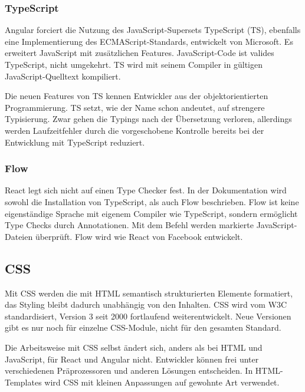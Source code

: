 \subsubsection{TypeScript}
Angular forciert die Nutzung des JavaScript-Supersets TypeScript (TS), ebenfalls eine Implementierung des ECMAScript-Standards, entwickelt von Microsoft. Es erweitert JavaScript mit zusätzlichen Features. JavaScript-Code ist valides TypeScript, nicht umgekehrt. TS wird mit seinem Compiler in gültigen JavaScript-Quelltext kompiliert.

Die neuen Features von TS kennen Entwickler aus der objektorientierten Programmierung. TS setzt, wie der Name schon andeutet, auf strengere Typisierung. Zwar gehen die Typings nach der Übersetzung verloren, allerdings werden Laufzeitfehler durch die vorgeschobene Kontrolle bereits bei der Entwicklung mit TypeScript reduziert.\cite{TypeScript}

\subsubsection{Flow}

React legt sich nicht auf einen Type Checker fest. In der Dokumentation wird sowohl die Installation von TypeScript, als auch Flow beschrieben. Flow ist keine eigenständige Sprache mit eigenem Compiler wie TypeScript, sondern ermöglicht Type Checks durch Annotationen. Mit dem Befehl  werden markierte JavaScript-Dateien überprüft. Flow wird wie React von Facebook entwickelt.\cite{Flow}

\subsection{CSS}
Mit CSS werden die mit HTML semantisch strukturierten Elemente formatiert, das Styling bleibt dadurch unabhängig von den Inhalten. CSS wird vom W3C standardisiert, Version 3 seit 2000 fortlaufend weiterentwickelt. Neue Versionen gibt es nur noch für einzelne CSS-Module, nicht für den gesamten Standard.\cite{CSS4} 

Die Arbeitsweise mit CSS selbst ändert sich, anders als bei HTML und JavaScript, für React und Angular nicht. Entwickler können frei unter verschiedenen Präprozessoren und anderen Lösungen entscheiden. In HTML-Templates wird CSS mit kleinen Anpassungen auf gewohnte Art verwendet.

